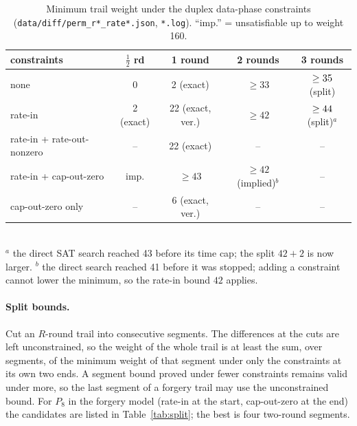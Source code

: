 \documentclass{iacrtrans}
\newcommand{\PP}[1]{P_{#1}}
\newcommand{\WrateTwo}{42}   %
\newcommand{\WuncTwo}{33}    %
\newcommand{\WrateThree}{\the\numexpr\WrateTwo+2\relax}   %
\begin{document}
\begin{table}[htb]
\centering
\caption{Minimum trail weight under the duplex data-phase constraints (\texttt{data/diff/perm\_r*\_rate*.json}, \texttt{*.log}). ``imp.'' = unsatisfiable up to weight 160.}
\label{tab:diffrate}
\small
\begin{tabular}{lcccc}
\toprule
constraints & $\tfrac12$ rd & 1 round & 2 rounds & 3 rounds\\
\midrule
none & 0 & 2 (exact) & $\geq \WuncTwo$ & $\geq \the\numexpr 2+\WuncTwo\relax$ (split)\\
rate-in & 2 (exact) & 22 (exact, ver.) & $\geq \WrateTwo$ & $\geq \WrateThree$ (split)$^{a}$\\
rate-in + rate-out-nonzero & -- & 22 (exact) & -- & --\\
rate-in + cap-out-zero & imp. & $\geq 43$ & $\geq \WrateTwo$ (implied)$^{b}$ & --\\
cap-out-zero only & -- & 6 (exact, ver.) & -- & --\\
\bottomrule
\end{tabular}\\[2pt]
{\footnotesize $^{a}$ the direct SAT search reached 43 before its time cap; the split $\WrateTwo + 2$ is now larger. $^{b}$ the direct search reached 41 before it was stopped; adding a constraint cannot lower the minimum, so the rate-in bound $\WrateTwo$ applies.}
\end{table}

\paragraph{Split bounds.}
\label{sec:split}
Cut an $R$-round trail into consecutive segments. The differences at the cuts are left unconstrained, so the weight of the whole trail is at least the sum, over segments, of the minimum weight of that segment under only the constraints at its own two ends. A segment bound proved under fewer constraints remains valid under more, so the last segment of a forgery trail may use the unconstrained bound. For $\PP{8}$ in the forgery model (\textsf{rate-in} at the start, \textsf{cap-out-zero} at the end) the candidates are listed in Table~\ref{tab:split}; the best is four two-round segments.
\end{document}
